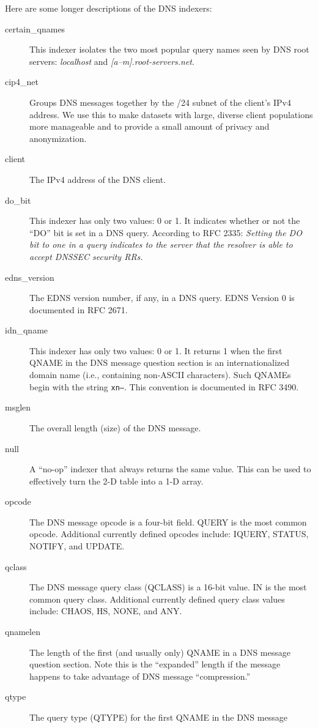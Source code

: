 \documentclass{report}
\begin{document}
\noindent
Here are some longer descriptions of the DNS indexers:

\begin{description}
\item[certain\_qnames]
	This indexer isolates the two most popular query names seen
	by DNS root servers: {\em localhost\/} and {\em
	[a--m].root-servers.net\/}.
\item[cip4\_net]
	Groups DNS messages together by the /24 subnet of the
	client's IPv4 address.  We use this to make datasets with
	large, diverse client populations more manageable and to
	provide a small amount of privacy and anonymization.
\item[client]
	The IPv4 address of the DNS client.
\item[do\_bit]
	This indexer has only two values: 0 or 1.  It indicates
	whether or not the ``DO'' bit is set in a DNS query.  According to
	RFC 2335: {\em Setting the DO bit to one in a query indicates to the server
	that the resolver is able to accept DNSSEC security RRs.}
\item[edns\_version]
	The EDNS version number, if any, in a DNS query.  EDNS
	Version 0 is documented in RFC 2671.
\item[idn\_qname]
	This indexer has only two values: 0 or 1.  It returns 1
	when the first QNAME in the DNS message question section
	is an internationalized domain name (i.e., containing
	non-ASCII characters).  Such QNAMEs begin with the string
	{\tt xn--\/}.  This convention is documented in RFC 3490.
\item[msglen]
	The overall length (size) of the DNS message.
\item[null]
	A ``no-op'' indexer that always returns the same value.
	This can be used to effectively turn the 2-D table into a
	1-D array.
\item[opcode]
	The DNS message opcode is a four-bit field.  QUERY is the
	most common opcode.  Additional currently defined opcodes
	include: IQUERY, STATUS, NOTIFY, and UPDATE.
\item[qclass]
	The DNS message query class (QCLASS) is a 16-bit value.  IN
	is the most common query class.  Additional currently defined
	query class values include: CHAOS, HS, NONE, and ANY.
\item[qnamelen]
	The length of the first (and usually only) QNAME in a DNS
	message question section.  Note this is the ``expanded''
	length if the message happens to take advantage of DNS
	message ``compression.''
\item[qtype]
	The query type (QTYPE) for the first QNAME in the DNS message

\end{description}
\end{document}
